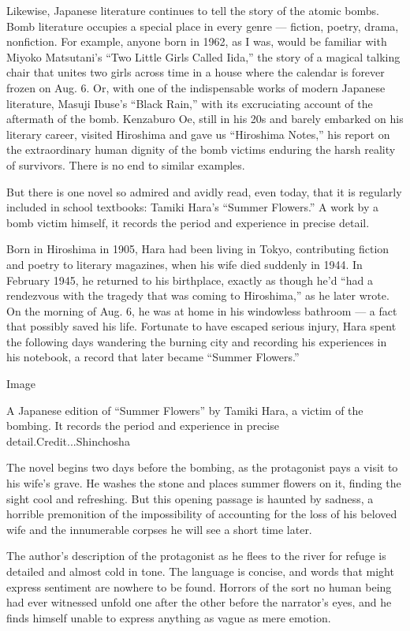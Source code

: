 Likewise, Japanese literature continues to tell the story of the atomic
bombs. Bomb literature occupies a special place in every genre ---
fiction, poetry, drama, nonfiction. For example, anyone born in 1962, as
I was, would be familiar with Miyoko Matsutani's ``Two Little Girls
Called Iida,'' the story of a magical talking chair that unites two
girls across time in a house where the calendar is forever frozen on
Aug. 6. Or, with one of the indispensable works of modern Japanese
literature, Masuji Ibuse's ``Black Rain,'' with its excruciating account
of the aftermath of the bomb. Kenzaburo Oe, still in his 20s and barely
embarked on his literary career, visited Hiroshima and gave us
``Hiroshima Notes,'' his report on the extraordinary human dignity of
the bomb victims enduring the harsh reality of survivors. There is no
end to similar examples.

But there is one novel so admired and avidly read, even today, that it
is regularly included in school textbooks: Tamiki Hara's ``Summer
Flowers.'' A work by a bomb victim himself, it records the period and
experience in precise detail.

Born in Hiroshima in 1905, Hara had been living in Tokyo, contributing
fiction and poetry to literary magazines, when his wife died suddenly in
1944. In February 1945, he returned to his birthplace, exactly as though
he'd ``had a rendezvous with the tragedy that was coming to Hiroshima,''
as he later wrote. On the morning of Aug. 6, he was at home in his
windowless bathroom --- a fact that possibly saved his life. Fortunate
to have escaped serious injury, Hara spent the following days wandering
the burning city and recording his experiences in his notebook, a record
that later became ``Summer Flowers.''

Image

A Japanese edition of ``Summer Flowers'' by Tamiki Hara, a victim of the
bombing. It records the period and experience in precise
detail.Credit...Shinchosha

The novel begins two days before the bombing, as the protagonist pays a
visit to his wife's grave. He washes the stone and places summer flowers
on it, finding the sight cool and refreshing. But this opening passage
is haunted by sadness, a horrible premonition of the impossibility of
accounting for the loss of his beloved wife and the innumerable corpses
he will see a short time later.

The author's description of the protagonist as he flees to the river for
refuge is detailed and almost cold in tone. The language is concise, and
words that might express sentiment are nowhere to be found. Horrors of
the sort no human being had ever witnessed unfold one after the other
before the narrator's eyes, and he finds himself unable to express
anything as vague as mere emotion.

